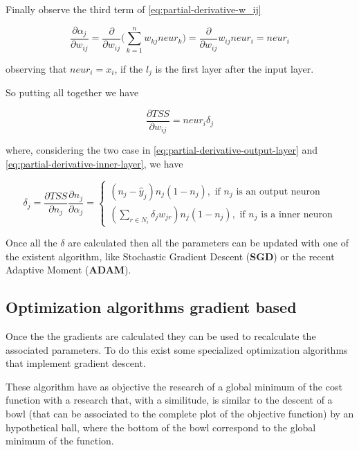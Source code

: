Finally observe the third term of \ref{eq:partial-derivative-w_ij}
\begin{center}
	\begin{equation}
		\frac{\partial{\alpha_j}}{\partial{w_{ij}}} = \frac{\partial{}}{\partial{w_{ij}}}\Bigg(\sum\limits_{k=1}^n w_{kj}neur_k\Bigg) = \frac{\partial{}}{\partial{w_{ij}}}w_{ij}neur_i = neur_i
	\end{equation}
\end{center}
observing that $neur_i = x_i$, if the $l_j$ is the first layer after the input layer.

So putting all together we have 
\begin{center}
	\begin{equation}
		\frac{\partial{TSS}}{\partial{w_{ij}}} = neur_i\delta_j
	\end{equation}
\end{center}
where, considering the two case in \ref{eq:partial-derivative-output-layer} and \ref{eq:partial-derivative-inner-layer}, we have
\begin{center}
	\begin{equation}
		\delta_j = \frac{\partial{TSS}}{\partial{n_j}}\frac{\partial{n_j}}{\partial{\alpha_j}} = \left.
		\begin{cases}
			(n_j - \hat{y}_j)n_j(1 - n_j),\textrm{ if } n_j \textrm{ is an output neuron} \\
(\sum\limits_{r	\in N_i}\delta_{j}w_{jr})n_{j}(1 - n_{j}), \textrm{ if }n_j\textrm{ is a inner neuron}
		\end{cases}\right.
	\end{equation}
\end{center} 

Once all the $\delta$ are calculated then all the parameters can be updated with one of the existent algorithm, like Stochastic Gradient Descent (\textbf{SGD}) or the recent Adaptive Moment (\textbf{ADAM}).


\subsection{Optimization algorithms gradient based}
Once the the gradients are calculated they can be used to recalculate the associated parameters. To do this exist some specialized optimization algorithms that implement gradient descent.

These algorithm have as objective the research of a global minimum of the cost function with a research that, with a similitude, is similar to the descent of a bowl (that can be associated to the complete plot of the objective function) by an hypothetical ball, where the bottom of the bowl correspond to the global minimum of the function.


